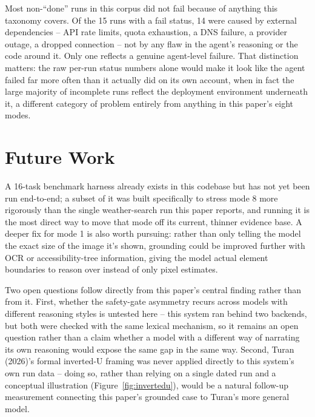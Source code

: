 \documentclass[11pt]{article}
\begin{document}
Most non-``done'' runs in this corpus did not fail because of anything this taxonomy covers. Of the 15 runs with a fail status, 14 were caused by external dependencies -- API rate limits, quota exhaustion, a DNS failure, a provider outage, a dropped connection -- not by any flaw in the agent's reasoning or the code around it. Only one reflects a genuine agent-level failure. That distinction matters: the raw per-run status numbers alone would make it look like the agent failed far more often than it actually did on its own account, when in fact the large majority of incomplete runs reflect the deployment environment underneath it, a different category of problem entirely from anything in this paper's eight modes.
\section{Future Work}
\label{sec:future}
A 16-task benchmark harness already exists in this codebase but has not yet been run end-to-end; a subset of it was built specifically to stress mode 8 more rigorously than the single weather-search run this paper reports, and running it is the most direct way to move that mode off its current, thinner evidence base. A deeper fix for mode 1 is also worth pursuing: rather than only telling the model the exact size of the image it's shown, grounding could be improved further with OCR or accessibility-tree information, giving the model actual element boundaries to reason over instead of only pixel estimates.

Two open questions follow directly from this paper's central finding rather than from it. First, whether the safety-gate asymmetry recurs across models with different reasoning styles is untested here -- this system ran behind two backends, but both were checked with the same lexical mechanism, so it remains an open question rather than a claim whether a model with a different way of narrating its own reasoning would expose the same gap in the same way. Second, Turan (2026)'s formal inverted-U framing was never applied directly to this system's own run data -- doing so, rather than relying on a single dated run and a conceptual illustration (Figure~\ref{fig:invertedu}), would be a natural follow-up measurement connecting this paper's grounded case to Turan's more general model.
\end{document}
